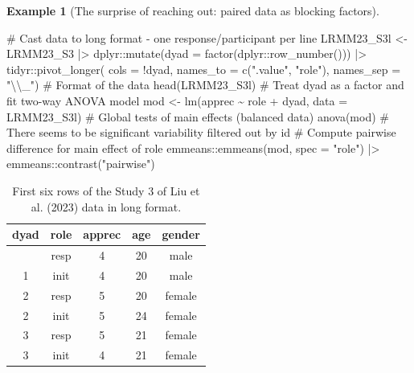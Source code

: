 \documentclass[
  11pt,
  letterpaper,
]{scrbook}
\newenvironment{Shaded}{\begin{snugshade}}{\end{snugshade}}
\newcommand{\AttributeTok}[1]{\textcolor[rgb]{0.40,0.45,0.13}{#1}}
\newcommand{\CommentTok}[1]{\textcolor[rgb]{0.37,0.37,0.37}{#1}}
\newcommand{\FunctionTok}[1]{\textcolor[rgb]{0.28,0.35,0.67}{#1}}
\newcommand{\NormalTok}[1]{\textcolor[rgb]{0.00,0.23,0.31}{#1}}
\newcommand{\OtherTok}[1]{\textcolor[rgb]{0.00,0.23,0.31}{#1}}
\newcommand{\SpecialCharTok}[1]{\textcolor[rgb]{0.37,0.37,0.37}{#1}}
\newcommand{\StringTok}[1]{\textcolor[rgb]{0.13,0.47,0.30}{#1}}
\theoremstyle{definition}
\theoremstyle{definition}
\newtheorem{example}{Example}[chapter]
\theoremstyle{remark}
\begin{document}
\begin{example}[The surprise of reaching out: paired data as blocking
factors]
\begin{Shaded}
\begin{Highlighting}[]
\CommentTok{\# Cast data to long format {-} one response/participant per line}
\NormalTok{LRMM23\_S3l }\OtherTok{\textless{}{-}}\NormalTok{ LRMM23\_S3 }\SpecialCharTok{|\textgreater{}}
\NormalTok{  dplyr}\SpecialCharTok{::}\FunctionTok{mutate}\NormalTok{(}\AttributeTok{dyad =} \FunctionTok{factor}\NormalTok{(dplyr}\SpecialCharTok{::}\FunctionTok{row\_number}\NormalTok{())) }\SpecialCharTok{|\textgreater{}} 
\NormalTok{  tidyr}\SpecialCharTok{::}\FunctionTok{pivot\_longer}\NormalTok{(}
    \AttributeTok{cols =} \SpecialCharTok{!}\NormalTok{dyad, }
    \AttributeTok{names\_to =} \FunctionTok{c}\NormalTok{(}\StringTok{".value"}\NormalTok{, }\StringTok{"role"}\NormalTok{),}
    \AttributeTok{names\_sep =} \StringTok{"}\SpecialCharTok{\textbackslash{}\textbackslash{}}\StringTok{\_"}\NormalTok{)}
\CommentTok{\# Format of the data}
\FunctionTok{head}\NormalTok{(LRMM23\_S3l)}
\CommentTok{\# Treat dyad as a factor and fit two{-}way ANOVA model}
\NormalTok{mod }\OtherTok{\textless{}{-}} \FunctionTok{lm}\NormalTok{(apprec }\SpecialCharTok{\textasciitilde{}}\NormalTok{ role }\SpecialCharTok{+}\NormalTok{ dyad, }\AttributeTok{data =}\NormalTok{ LRMM23\_S3l)}
\CommentTok{\# Global tests of main effects (balanced data)}
\FunctionTok{anova}\NormalTok{(mod) }\CommentTok{\# There seems to be significant variability filtered out by \textquotesingle{}id\textquotesingle{}}
\CommentTok{\# Compute pairwise difference for main effect of \textquotesingle{}role\textquotesingle{}}
\NormalTok{emmeans}\SpecialCharTok{::}\FunctionTok{emmeans}\NormalTok{(mod, }\AttributeTok{spec =} \StringTok{"role"}\NormalTok{) }\SpecialCharTok{|\textgreater{}}
\NormalTok{  emmeans}\SpecialCharTok{::}\FunctionTok{contrast}\NormalTok{(}\StringTok{"pairwise"}\NormalTok{)}
\end{Highlighting}
\end{Shaded}

\begin{longtable}[]{@{}ccccc@{}}

\caption{\label{tbl-longdat}First six rows of the Study 3 of Liu et al.
(2023) data in long format.}

\tabularnewline

\toprule\noalign{}
dyad & role & apprec & age & gender \\
\midrule\noalign{}
\endhead
\bottomrule\noalign{}
\endlastfoot
1 & resp & 4 & 20 & male \\
1 & init & 4 & 20 & male \\
2 & resp & 5 & 20 & female \\
2 & init & 5 & 24 & female \\
3 & resp & 5 & 21 & female \\
3 & init & 4 & 21 & female \\


\end{longtable}
\end{example}
\end{document}
